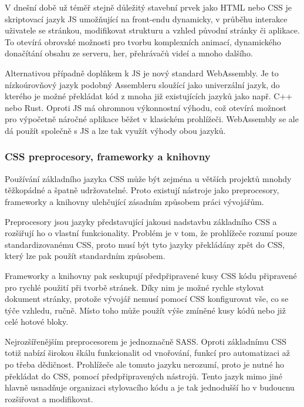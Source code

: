 		V dnešní době už téměř stejně důležitý stavební prvek jako \Ac{HTML} nebo \Ac{CSS} je skriptovací jazyk \ac{JS}
		umožňující na front-endu dynamicky, v průběhu interakce uživatele se stránkou, modifikovat strukturu a vzhled
		původní stránky či aplikace.
		To otevírá obrovské možnosti pro tvorbu komplexních animací, dynamického donačítání obsahu ze serveru, her, přehrávačů
		videí a mnoho dalšího. \cite{what_is_javascript}

		Alternativou případně doplňkem k \ac{JS} je nový standard WebAssembly.
		Je to nízkoúrovňový jazyk podobný Assembleru sloužící jako univerzální jazyk, do kterého je možné překládat
		kód z mnoha již existujících jazyků jako např. C++ nebo Rust.
		Oproti \ac{JS} má ohromnou výkonnostní výhodu, což otevírá možnost pro výpočetně náročné aplikace běžet
		v klasickém prohlížeči.
		WebAssembly se ale dá použít společně s \ac{JS} a lze tak využít výhody obou jazyků. \cite{webassembly}

		\subsubsection{CSS preprocesory, frameworky a knihovny}

		Používání základního jazyka \Ac{CSS} může být zejména u větších projektů mnohdy těžkopádné a špatně udržovatelné.
		Proto existují nástroje jako preprocesory, frameworky a knihovny ulehčující zásadním způsobem práci vývojářům.

		Preprocesory jsou jazyky představující jakousi nadstavbu základního \Ac{CSS} a rozšiřují ho o vlastní
		funkcionality.
		Problém je v tom, že prohlížeče rozumí pouze standardizovanému \Ac{CSS}, proto musí být tyto jazyky překládány
		zpět do \Ac{CSS}, který lze pak použít standardním způsobem.

		Frameworky a knihovny pak seskupují předpřipravené kusy \Ac{CSS} kódu připravené pro rychlé použití při tvorbě stránek.
		Díky nim je možné rychle stylovat dokument stránky, protože vývojář nemusí pomocí \Ac{CSS} konfigurovat vše, co se
		týče vzhledu, ručně.
		Místo toho může použít výše zmíněné kusy kódů nebo již celé hotové bloky.

		Nejrozšířenějším preprocesorem je jednoznačně \Ac{SASS}.
		Oproti základnímu \Ac{CSS} totiž nabízí širokou škálu funkcionalit od vnořování, funkcí pro automatizaci až po třeba
		dědičnost.
		Prohlížeče ale tomuto jazyku nerozumí, proto je nutné ho překládat do \Ac{CSS}, pomocí předpřipravených nástrojů.
		Tento jazyk mimo jiné hlavně usnadňuje organizaci stylovacího kódu a je tak jednodušší ho v budoucnu rozšiřovat a
		modifikovat. \cite{learn_sass}

